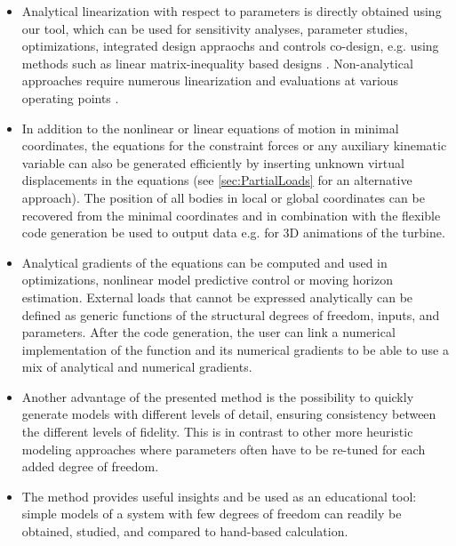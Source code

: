 \documentclass[wes, manuscript]{copernicus}
\begin{document}
\begin{itemize}
\item Analytical linearization with respect to parameters is directly obtained using our tool, which can be used for sensitivity analyses, parameter studies, optimizations, integrated design appraochs and controls co-design, e.g. using methods such as linear matrix-inequality based designs \citep{Poschke:2020}.  Non-analytical approaches require numerous linearization and evaluations at various operating points \citep{Jonkman:2022lin}.

\item In addition to the nonlinear or linear equations of motion in minimal coordinates, the equations for the constraint forces or any auxiliary kinematic variable can also be generated efficiently by inserting unknown virtual displacements in the equations (see \autoref{sec:PartialLoads} for an alternative approach). 
The position of all bodies in local or global coordinates can be recovered from the minimal coordinates and in combination with the flexible code generation be used to output data e.g. for 3D animations of the turbine. 

\item Analytical gradients of the equations can be computed and used in optimizations,
nonlinear model predictive control or moving horizon estimation.
    External loads that cannot be expressed analytically can be defined as generic functions of the structural degrees of freedom, inputs, and parameters.
    After the code generation, the user can link a numerical implementation of the function and its numerical gradients to be able to use a mix of analytical and numerical gradients.

\item Another advantage of the presented method is the possibility to quickly generate models with different levels of detail, ensuring consistency between the different levels of fidelity.
This is in contrast to other more heuristic modeling approaches where parameters often have to be re-tuned for each added degree of freedom.

\item The method provides useful insights and be used as an educational tool: simple models of a system with few degrees of freedom can readily be obtained, studied, and compared to hand-based calculation.
\end{itemize}
\end{document}
